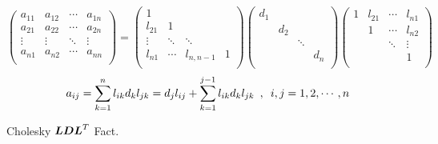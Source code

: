 \documentclass[12pt, leqno]{article}
\begin{document}
\evs
\[
	\begin{pmatrix}
		a_{11} & a_{12} & \cdots & a_{1n} \\
		a_{21} & a_{22} & \cdots & a_{2n} \\
		\vdots & \vdots & \ddots & \vdots \\
		a_{n1} & a_{n2} & \cdots & a_{nn} \\
	\end{pmatrix} =
	\begin{pmatrix}
		1 & ~ & ~ & ~ \\
		l_{21} & 1 & ~ & ~ \\
		\vdots & \ddots & \ddots & ~ \\
		l_{n1} & \cdots & l_{n,n-1} & 1 \\
	\end{pmatrix}
	\begin{pmatrix}
		d_1 & & & \\
		& d_2 & & \\
		& & \ddots & \\
		& & & d_n \\
	\end{pmatrix}
	\begin{pmatrix}
		1 & l_{21} & \cdots & l_{n1} \\
		~ & 1 & \cdots & l_{n2} \\
		~ & ~ & \ddots & \vdots \\
		~ & ~ & ~ & 1 \\
	\end{pmatrix}
\]
\[
	a_{ij} = \sum_{k=1}^n l_{ik} d_{k} l_{jk} =
	d_j l_{ij} + \sum_{k=1}^{j-1} l_{ik} d_{k} l_{jk} \enspace,\enspace
	i,j=1,2,\cdots,n
\]
\tvs
\begin{algo}[!h]{-5em}
	\caption{Cholesky $\boldsymbol{LDL}^T$ Fact.\@}
	\label{algo:chol_ldl_fact}
\end{algo}
\tvs
{}
\end{document}
